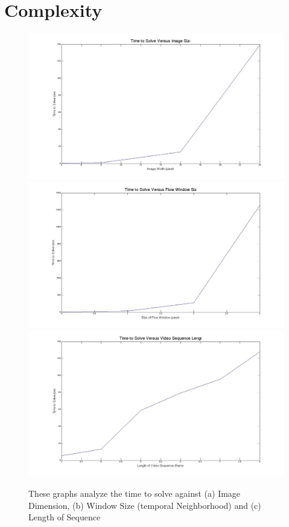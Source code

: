 \section{Complexity}

\begin{figure}[t]
\label{fig:Complexity}
\begin{centering}
\includegraphics[scale=0.125]{figures/time_vs_imsize.jpg}
\includegraphics[scale=0.125]{figures/time_vs_window.jpg}
\includegraphics[scale=0.125]{figures/time_vs_length.jpg}
\caption{These graphs analyze the time to solve against (a) Image Dimension, 
(b) Window Size (temporal Neighborhood) and (c) Length of Sequence }
\par\end{centering}
\end{figure}

